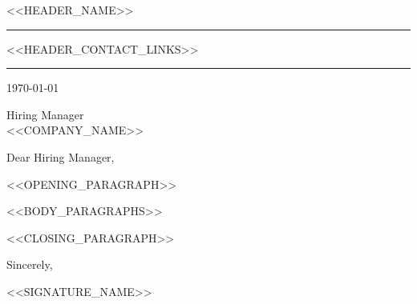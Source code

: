 \documentclass[letterpaper,11pt]{article}
\begin{document}
\begin{center}
    {\Huge\color{accentTitle} <<HEADER_NAME>>}\\[5pt]
    {\color{accentLine}\hrule}
    \vspace{4pt}
    \footnotesize{
        <<HEADER_CONTACT_LINKS>>
    }
    \vspace{2pt}
    {\color{accentLine}\hrule}
\end{center}

\vspace{20pt}

\today

\vspace{10pt}

Hiring Manager\\
<<COMPANY_NAME>>

\vspace{10pt}

Dear Hiring Manager,

\vspace{10pt}

<<OPENING_PARAGRAPH>>

<<BODY_PARAGRAPHS>>

<<CLOSING_PARAGRAPH>>

\vspace{20pt}

Sincerely,

\vspace{10pt}

<<SIGNATURE_NAME>>
\end{document}
